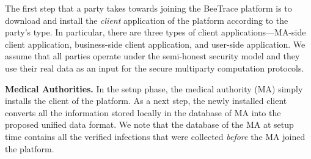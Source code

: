 \documentclass[11pt]{article}  %
\newcommand{\sysname}{\textsf{BeeTrace}\xspace}
\begin{document}


The first step that a party takes towards joining the \sysname platform is to download and install the \emph{client} application of the platform according to the party's type. In particular, there are three types of client applications---MA-side client application, business-side client application, and user-side application.
We assume that all parties operate under the semi-honest security model and they use their real data as an input for the secure multiparty computation protocols. 



\textbf{Medical Authorities. }In the setup phase, the medical authority (MA) simply installs the client of the platform. 
As a next step, the newly installed client converts all the information stored locally in the database of MA into the proposed unified data format. 
We note that the database of the MA at setup time contains all the verified infections that were collected \emph{before} the MA joined the platform.

\end{document}
